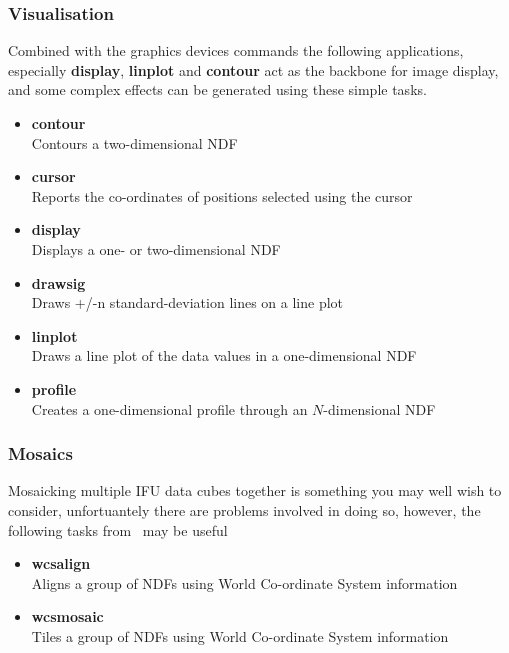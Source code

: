 \documentclass[twoside,11pt]{article}
\newcommand{\htmlref}[2]{#1}
\newcommand{\xref}[3]{#1}
\begin{document}
\begin{\htmlonly}
{\subsubsection{Visualisation}

Combined with the \htmlref{graphics devices commands}{sc16_graphics} the following applications, especially
{\bf display}, {\bf linplot} and {\bf contour} act as the backbone
for image display, and some complex effects can be generated using
these simple tasks.

\begin{itemize}  
\item{\xref{{\bf contour}}{sun95}{CONTOUR}}\\
Contours a two-dimensional NDF 
\item{\xref{{\bf cursor}}{sun95}{CURSOR}}\\
Reports the co-ordinates of positions selected using the cursor 
\item{\xref{{\bf display}}{sun95}{DISPLAY}}\\
Displays a one- or two-dimensional NDF 
\item{\xref{{\bf drawsig}}{sun95}{DRAWSIG}}\\
Draws +/-n standard-deviation lines on a line plot 
\item{\xref{{\bf linplot}}{sun95}{LINPLOT}}\\
Draws a line plot of the data values in a one-dimensional NDF 
\item{\xref{{\bf profile}}{sun95}{PROFILE}}\\
Creates a one-dimensional profile through an $N$-dimensional NDF 
\end{itemize}  

\subsubsection{Mosaics}

Mosaicking multiple IFU data cubes together is something you may well
wish to consider, unfortuantely there are \htmlref{problems}{sc16_mos}
involved in doing so, however,
the following tasks from \KAPPA\ may be useful

\begin{itemize}  
\item{\xref{{\bf wcsalign}}{sun95}{WCSALIGN}}\\
Aligns a group of NDFs using World Co-ordinate System information 
\item{\xref{{\bf wcsmosaic}}{sun95}{WCSMOSAIC}}\\
Tiles a group of NDFs using World Co-ordinate System information
\end{itemize}

}
\end{\htmlonly}
\end{document}
